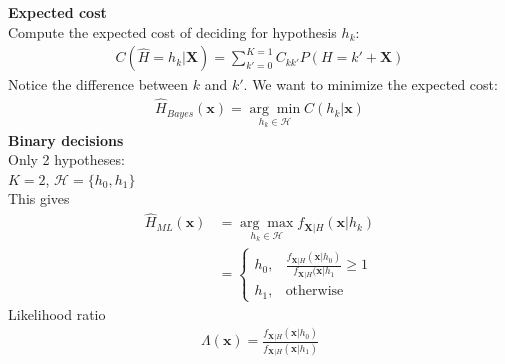 \documentclass[12pt,a4paper]{report}
\begin{document}
\textbf{Expected cost}\\
Compute the expected cost of deciding for hypothesis $h_k$:
\begin{align*}
C(\hat{H}=h_k|\mathbf{X})=\sum_{k'=0}^{K=1}C_{kk'}P(H=k'+\mathbf{X})
\end{align*}
Notice the difference between $k$ and $k'$. We want to minimize the expected cost:
\begin{align*}
\hat{H}_{Bayes}(\mathbf{x})=\underset{h_k\in\mathcal{H}}{\arg\min}C(h_k|\mathbf{x})
\end{align*}
\textbf{Binary decisions}\\
Only 2 hypotheses:\\
$K=2$, $\mathcal{H}=\{h_0,h_1\}$\\
This gives
\begin{align*}
\hat{H}_{ML}(\mathbf{x})&=\underset{h_k\in\mathcal{H}}{\arg\max}f_{\mathbf{X}|H}(\mathbf{x}|h_k)\\
&=\begin{cases}h_0,&\frac{f_{\mathbf{X}|H}(\mathbf{x}|h_0)}{f_{\mathbf{X}|H}(\mathbf{x}|h_1}\geq1\\h_1,&\text{otherwise}\end{cases}
\end{align*}
Likelihood ratio
\begin{align*}
\Lambda(\mathbf{x})=\frac{f_{\mathbf{X}|H}(\mathbf{x}|h_0)}{f_{\mathbf{X}|H}(\mathbf{x}|h_1)}
\end{align*}
\end{document}

